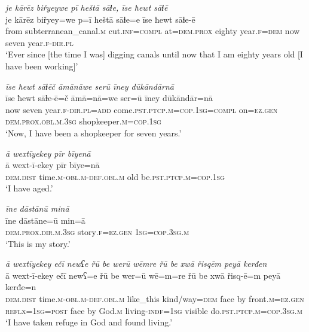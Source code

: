 \ea \label{ŽM.7}
\textit{je kārēz biřyeywe pī heštā sāɫe, īse ħewt sāɫē} \\ 
\gll je kārēz biřyey=we p=ī heštā sāɫe=e īse ħewt sāɫe-ē \\ 
 from subterranean\_canal\textsc{.m} cut\textsc{.inf}\textsc{=compl} at=\textsc{dem.prox} eighty year\textsc{.f}\textsc{=dem} now seven year\textsc{.f}\textsc{-dir}\textsc{.pl} \\ 
\glt `Ever since [the time I was] digging canals until now that I am eighty years old [I have been working]'
\z 
 
\ea \label{ŽM.8}
\textit{īse ħewt sāɫēč āmānāwe serū īney dūkāndārnā} \\ 
\gll īse ħewt sāɫe-ē=č āmā=nā=we ser=ū īney dūkāndār=nā \\ 
 now seven year\textsc{.f}\textsc{-dir}\textsc{.pl}\textsc{=add} come\textsc{.pst}\textsc{.ptcp}\textsc{.m}\textsc{=cop}\textsc{.\textsc{1sg}}\textsc{=compl} on\textsc{=ez.gen} \textsc{dem.prox}\textsc{.obl}\textsc{.m}\textsc{.3sg} shopkeeper\textsc{.m}\textsc{=cop}\textsc{.\textsc{1sg}} \\ 
\glt `Now, I have been a shopkeeper for seven years.'
\z 
 
\ea \label{ŽM.10}
\textit{ā wextīyekey pīr bīyenā} \\ 
\gll ā wext-ī-ekey pīr bīye=nā \\ 
 \textsc{dem.dist} time\textsc{.m}\textsc{-obl}\textsc{.m}\textsc{-def}\textsc{.obl}\textsc{.m} old be\textsc{.pst}\textsc{.ptcp}\textsc{.m}\textsc{=cop}\textsc{.\textsc{1sg}} \\ 
\glt `I have aged.'
\z 
 
\ea \label{ŽM.12}
\textit{īne dāstānū minā} \\ 
\gll īne dāstāne=ū min=ā \\ 
 \textsc{dem.prox}\textsc{.dir}\textsc{.m}\textsc{.3sg} story\textsc{.f}\textsc{=ez.gen} \textsc{1sg}\textsc{=cop}\textsc{.3sg}\textsc{.m} \\ 
\glt `This is my story.'
\z 
 
\ea \label{ŽM.15}
\textit{ā wextīyekey ečī newʕe řū be werū wēmre řū be xwā řisqēm peyā kerđen} \\ 
\gll ā wext-ī-ekey ečī newʕ=e řū be wer=ū wē=m=re řū be xwā řisq-ē=m peyā kerđe=n \\ 
 \textsc{dem.dist} time\textsc{.m}\textsc{-obl}\textsc{.m}\textsc{-def}\textsc{.obl}\textsc{.m} like\_this kind/way\textsc{=dem} face by front\textsc{.m}\textsc{=ez.gen} \textsc{reflx}\textsc{=\textsc{1sg}}\textsc{=\textsc{post}} face by God\textsc{.m} living\textsc{-indf}\textsc{=\textsc{1sg}} visible do\textsc{.pst}\textsc{.ptcp}\textsc{.m}\textsc{=cop}\textsc{.3sg}\textsc{.m} \\ 
\glt `I have taken refuge in God and found living.'
\z 
 
